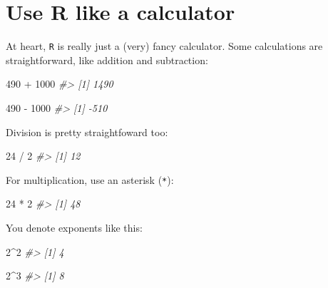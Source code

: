 \documentclass[
]{book}
\newenvironment{Shaded}{\begin{snugshade}}{\end{snugshade}}
\newcommand{\CommentTok}[1]{\textcolor[rgb]{0.56,0.35,0.01}{\textit{#1}}}
\newcommand{\DecValTok}[1]{\textcolor[rgb]{0.00,0.00,0.81}{#1}}
\newcommand{\SpecialCharTok}[1]{\textcolor[rgb]{0.00,0.00,0.00}{#1}}
\begin{document}
\hypertarget{use-r-like-a-calculator}{%
\section*{Use R like a calculator}\label{use-r-like-a-calculator}}

At heart, \texttt{R} is really just a (very) fancy calculator. Some calculations are straightforward, like addition and subtraction:

\begin{Shaded}
\begin{Highlighting}[]
\DecValTok{490} \SpecialCharTok{+} \DecValTok{1000}
\CommentTok{\#\textgreater{} [1] 1490}
\end{Highlighting}
\end{Shaded}

\begin{Shaded}
\begin{Highlighting}[]
\DecValTok{490} \SpecialCharTok{{-}} \DecValTok{1000}
\CommentTok{\#\textgreater{} [1] {-}510}
\end{Highlighting}
\end{Shaded}

Division is pretty straightfoward too:

\begin{Shaded}
\begin{Highlighting}[]
\DecValTok{24} \SpecialCharTok{/} \DecValTok{2}
\CommentTok{\#\textgreater{} [1] 12}
\end{Highlighting}
\end{Shaded}

For multiplication, use an asterisk (\texttt{*}):

\begin{Shaded}
\begin{Highlighting}[]
\DecValTok{24} \SpecialCharTok{*} \DecValTok{2}
\CommentTok{\#\textgreater{} [1] 48}
\end{Highlighting}
\end{Shaded}

You denote exponents like this:

\begin{Shaded}
\begin{Highlighting}[]
\DecValTok{2}\SpecialCharTok{\^{}}\DecValTok{2}
\CommentTok{\#\textgreater{} [1] 4}
\end{Highlighting}
\end{Shaded}

\begin{Shaded}
\begin{Highlighting}[]
\DecValTok{2}\SpecialCharTok{\^{}}\DecValTok{3}
\CommentTok{\#\textgreater{} [1] 8}
\end{Highlighting}
\end{Shaded}
\end{document}
